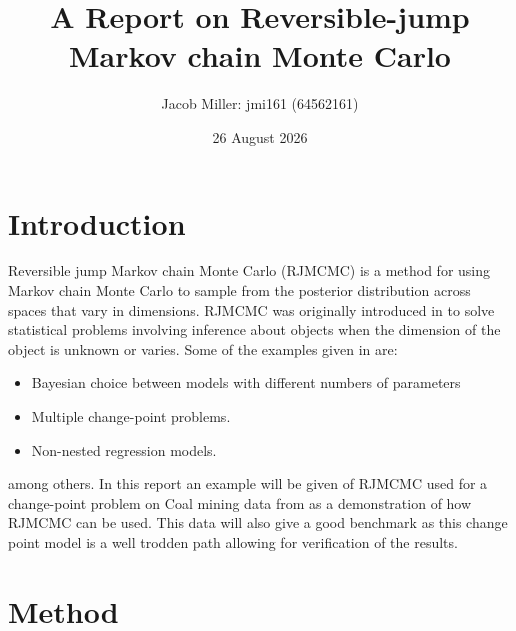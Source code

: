 \documentclass[10pt]{article}
\title{A Report on Reversible-jump Markov chain Monte Carlo}
\author{Jacob Miller: jmi161 (64562161)}
\date{26 August 2026}
\begin{document}
\maketitle

\section{Introduction}

Reversible jump Markov chain Monte Carlo (RJMCMC) is a method for using Markov chain Monte Carlo to sample from the posterior distribution across spaces that vary in dimensions. RJMCMC was originally introduced in \cite{green1995reversible} to solve statistical problems involving inference about objects when the dimension of the object is unknown or varies. Some of the examples given in \textcite{green1995reversible} are: 
\begin{itemize}
  \item Bayesian choice between models with different numbers of parameters
  \item Multiple change-point problems.
  \item Non-nested regression models.
\end{itemize} among others. In this report an example will be given of RJMCMC used for a change-point problem on Coal mining data from \textcite{GeDsData} as a demonstration of how RJMCMC can be used. This data will also give a good benchmark as this change point model is a well trodden path allowing for verification of the results.

\section{Method}

\end{document}
